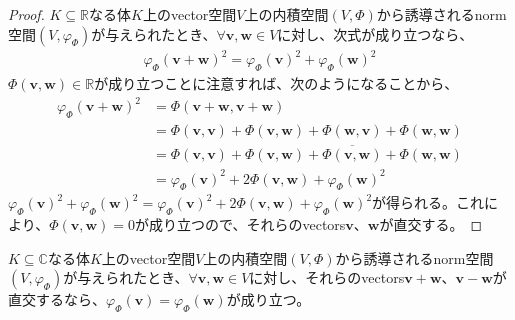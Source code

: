 \documentclass[dvipdfmx]{jsarticle}
\begin{document}
\begin{proof}
$K \subseteq \mathbb{R}$なる体$K$上のvector空間$V$上の内積空間$(V,\varPhi)$から誘導されるnorm空間$\left( V,\varphi_{\varPhi} \right)$が与えられたとき、$\forall\mathbf{v},\mathbf{w} \in V$に対し、次式が成り立つなら、
\begin{align*}
{\varphi_{\varPhi}\left( \mathbf{v} + \mathbf{w} \right)}^{2} = {\varphi_{\varPhi}\left( \mathbf{v} \right)}^{2} + {\varphi_{\varPhi}\left( \mathbf{w} \right)}^{2}
\end{align*}
$\varPhi\left( \mathbf{v},\mathbf{w} \right) \in \mathbb{R}$が成り立つことに注意すれば、次のようになることから、
\begin{align*}
{\varphi_{\varPhi}\left( \mathbf{v} + \mathbf{w} \right)}^{2} &= \varPhi\left( \mathbf{v} + \mathbf{w},\mathbf{v} + \mathbf{w} \right)\\
&= \varPhi\left( \mathbf{v},\mathbf{v} \right) + \varPhi\left( \mathbf{v},\mathbf{w} \right) + \varPhi\left( \mathbf{w},\mathbf{v} \right) + \varPhi\left( \mathbf{w},\mathbf{w} \right)\\
&= \varPhi\left( \mathbf{v},\mathbf{v} \right) + \varPhi\left( \mathbf{v},\mathbf{w} \right) + \overline{\varPhi\left( \mathbf{v},\mathbf{w} \right)} + \varPhi\left( \mathbf{w},\mathbf{w} \right)\\
&= {\varphi_{\varPhi}\left( \mathbf{v} \right)}^{2} + 2\varPhi\left( \mathbf{v},\mathbf{w} \right) + {\varphi_{\varPhi}\left( \mathbf{w} \right)}^{2}
\end{align*}
${\varphi_{\varPhi}\left( \mathbf{v} \right)}^{2} + {\varphi_{\varPhi}\left( \mathbf{w} \right)}^{2} = {\varphi_{\varPhi}\left( \mathbf{v} \right)}^{2} + 2\varPhi\left( \mathbf{v},\mathbf{w} \right) + {\varphi_{\varPhi}\left( \mathbf{w} \right)}^{2}$が得られる。これにより、$\varPhi\left( \mathbf{v},\mathbf{w} \right) = 0$が成り立つので、それらのvectors$\mathbf{v}$、$\mathbf{w}$が直交する。
\end{proof}
\begin{thm}\label{2.3.6.15}
$K \subseteq \mathbb{C}$なる体$K$上のvector空間$V$上の内積空間$(V,\varPhi)$から誘導されるnorm空間$\left( V,\varphi_{\varPhi} \right)$が与えられたとき、$\forall\mathbf{v},\mathbf{w} \in V$に対し、それらのvectors$\mathbf{v} + \mathbf{w}$、$\mathbf{v} - \mathbf{w}$が直交するなら、$\varphi_{\varPhi}\left( \mathbf{v} \right) = \varphi_{\varPhi}\left( \mathbf{w} \right)$が成り立つ。
\end{thm}
\end{document}
